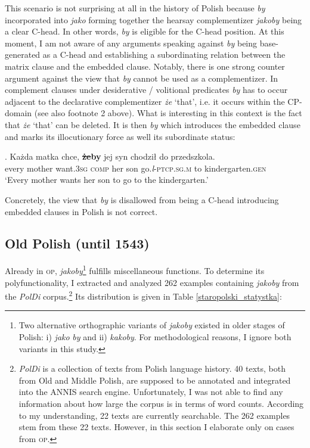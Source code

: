\documentclass[output=paper
,modfonts
,nonflat]{langsci/langscibook}
\newcommand{\glossformat}[1]{\textsc{#1}}
\newcommand{\thirdperson}{\glossformat{3}\xspace}
\newcommand{\comp}{\glossformat{comp}\xspace}
\newcommand{\gen}{\glossformat{gen}\xspace}
\newcommand{\lptcp}{\emph{l}\glossformat{-ptcp}\xspace}
\newcommand{\masc}{\glossformat{m}\xspace}
\newcommand{\sg}{\glossformat{sg}\xspace}
\begin{document}
{This scenario is not surprising at all in the history of Polish because \emph{by} incorporated into \emph{jako} forming together the hearsay complementizer \emph{jakoby} being a clear C-head. In other words, \emph{by} is eligible for the C-head position. At this moment, I am not aware of any arguments speaking against \emph{by} being base-generated as a C-head and establishing a subordinating relation between the matrix clause and the embedded clause. Notably, there is one strong counter argument against the view that \emph{by} cannot be used as a complementizer. In complement clauses under desiderative / volitional predicates \emph{by} has to occur adjacent to the declarative complementizer \emph{że} `that', i.e. it occurs within the CP-domain (see also footnote 2 above).  What is interesting in this context is the fact that \emph{że} `that' can be deleted. It is then \emph{by} which introduces the embedded clause and marks its illocutionary force as well its subordinate status:   

\exg.		Każda matka chce, {\textbf{\sout{że}by}} jej syn chodził do przedszkola. \\
		every mother want.{\thirdperson}{\sg} {\comp} her son go.{\lptcp}.{\sg}.{\masc} to kindergarten.{\gen} \\
		`Every mother wants her son to go to the kindergarten.'

Concretely, the view that \emph{by} is disallowed from being a C-head introducing embedded clauses in Polish is not correct.
}

\subsection{Old Polish (until 1543)}

Already in \textsc{op}, \emph{jakoby}\footnote{Two alternative orthographic variants of \emph{jakoby} existed in older stages of Polish: i) \emph{jako} \emph{by} and ii) \emph{kakoby}. For methodological reasons, I ignore both variants in this study.
}
 fulfills miscellaneous functions. To determine its polyfunctionality, I extracted and analyzed 262 examples containing \emph{jakoby} from the \emph{PolDi} corpus.\footnote{\emph{PolDi} is a collection of texts from Polish language history. 40 texts, both from Old and Middle Polish, are supposed to be annotated and integrated into the ANNIS search engine. Unfortunately, I was not able to find any information about how large the corpus is in terms of word counts. According to my understanding, 22 texts are currently searchable. The 262 examples stem from these 22 texts. However, in this section I elaborate only on cases from \textsc{op}.   

}
Its distribution is given in Table \ref{staropolski_statystka}:  
\end{document}

